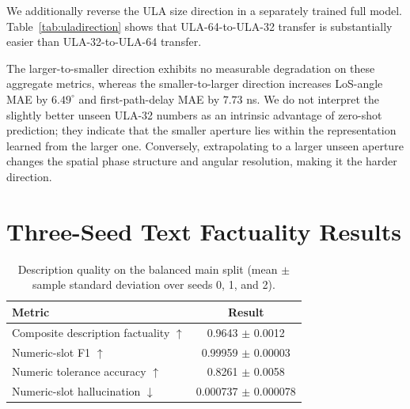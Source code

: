 \documentclass{article}
\begin{document}
We additionally reverse the ULA size direction in a separately trained full model.
Table~\ref{tab:uladirection} shows that ULA-64-to-ULA-32 transfer is substantially easier than ULA-32-to-ULA-64 transfer.

\begin{table}[t]
\centering
\caption{Directional ULA size transfer. Each row reports the seen training size and its unseen test size over three seeds.}
\label{tab:uladirection}
\end{table}

The larger-to-smaller direction exhibits no measurable degradation on these aggregate metrics, whereas the smaller-to-larger direction increases LoS-angle MAE by $6.49^\circ$ and first-path-delay MAE by $7.73$ ns.
We do not interpret the slightly better unseen ULA-32 numbers as an intrinsic advantage of zero-shot prediction; they indicate that the smaller aperture lies within the representation learned from the larger one.
Conversely, extrapolating to a larger unseen aperture changes the spatial phase structure and angular resolution, making it the harder direction.

\section{Three-Seed Text Factuality Results}
\label{sec:textresults}

\begin{table}[t]
\centering
\caption{Description quality on the balanced main split (mean $\pm$ sample standard deviation over seeds 0, 1, and 2).}
\label{tab:text}
\begin{tabular}{lc}
\toprule
Metric & Result\\
\midrule
Composite description factuality $\uparrow$ & 0.9643 $\pm$ 0.0012\\
Numeric-slot F1 $\uparrow$ & 0.99959 $\pm$ 0.00003\\
Numeric tolerance accuracy $\uparrow$ & 0.8261 $\pm$ 0.0058\\
Numeric-slot hallucination $\downarrow$ & 0.000737 $\pm$ 0.000078\\
\bottomrule
\end{tabular}
\end{table}
\end{document}
